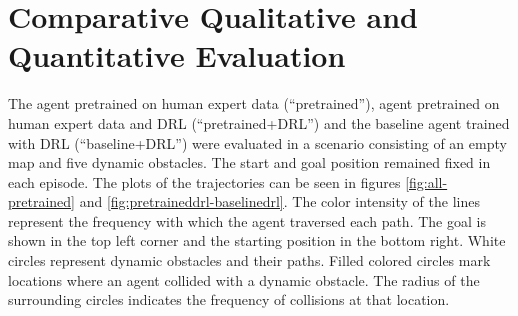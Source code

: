 \section{Comparative Qualitative and Quantitative Evaluation}
The agent pretrained on human expert data (“pretrained”), agent pretrained on human expert data and DRL (“pretrained+DRL”) and the baseline agent trained with DRL (“baseline+DRL”) were evaluated in a scenario consisting of an empty map and five dynamic obstacles. The start and goal position remained fixed in each episode. The plots of the trajectories can be seen in figures \ref{fig:all-pretrained} and \ref{fig:pretraineddrl-baselinedrl}. The color intensity of the lines represent the frequency with which the agent traversed each path. The goal is shown in the top left corner and the starting position in the bottom right. White circles represent dynamic obstacles and their paths. Filled colored circles mark locations where an agent collided with a dynamic obstacle. The radius of the surrounding circles indicates the frequency of collisions at that location. 

